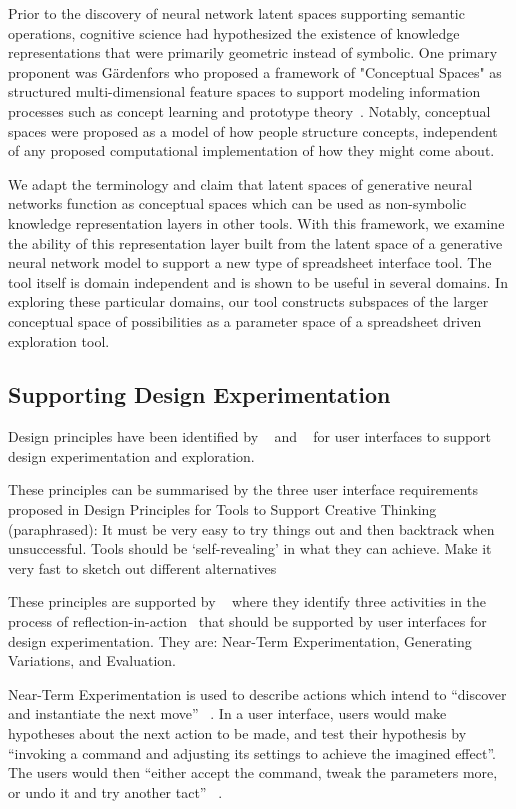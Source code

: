 \documentclass[letterpaper]{article}
\begin{document}
Prior to the discovery of neural network latent spaces supporting semantic operations, cognitive science had hypothesized the existence of knowledge representations that were primarily geometric instead of symbolic. One primary proponent was G{\"{a}}rdenfors who proposed a framework of "Conceptual Spaces" as structured multi-dimensional feature spaces to support modeling information processes such as concept learning and prototype theory~\cite{gardenfors11}. Notably, conceptual spaces were proposed as a model of how people structure concepts, independent of any proposed computational implementation of how they might come about.

We adapt the terminology and claim that latent spaces of generative neural networks function as conceptual spaces which can be used as non-symbolic knowledge representation layers in other tools. With this framework, we examine the ability of this representation layer built from the latent space of a generative neural network model to support a new type of spreadsheet interface tool. The tool itself is domain independent and is shown to be useful in several domains. In exploring these particular domains, our tool constructs subspaces of the larger conceptual space of possibilities as a parameter space of a spreadsheet driven exploration tool.

\subsection{Supporting Design Experimentation}

Design principles have been identified by ~\cite{resnick05} and ~\cite{terry02}
for user interfaces to support design experimentation and exploration.

These principles can be summarised by the three user interface requirements proposed in Design Principles for Tools to Support Creative Thinking~\cite{resnick05}  (paraphrased):
It must be very easy to try things out and then backtrack when unsuccessful.
Tools should be ‘self-revealing’ in what they can achieve.
Make it very fast to sketch out different alternatives

These principles are supported by ~\cite{terry02} where they identify three activities in the process of reflection-in-action~\cite{schon84} that should be supported by user interfaces for design experimentation. They are: Near-Term Experimentation, Generating Variations, and Evaluation.

Near-Term Experimentation is used to describe actions which intend to ``discover and instantiate the next move'' ~\cite[p. 39]{terry02}. In a user interface, users would make hypotheses about the next action to be made, and test their hypothesis by ``invoking a command and adjusting its settings to achieve the imagined effect''. The users would then ``either accept the command, tweak the parameters more, or undo it and try another tact'' ~\cite[p. 40]{terry02}.
\end{document}
